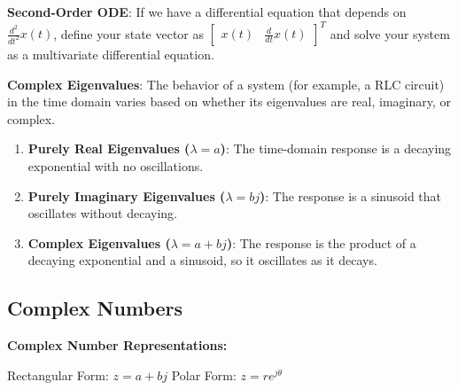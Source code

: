 \textbf{Second-Order ODE}: If we have a differential equation that depends on $\frac{d^2}{dt^2} x(t)$, define your state vector as $\begin{bmatrix} x(t) & \frac{d}{dt} x(t) \end{bmatrix}^T$ and solve your system as a multivariate differential equation.

\textbf{Complex Eigenvalues}: The behavior of a system (for example, a RLC circuit) in the time domain varies based on whether its eigenvalues are real, imaginary, or complex.
\begin{enumerate}
    \item \textbf{Purely Real Eigenvalues ($\lambda = a$)}: The time-domain response is a decaying exponential with no oscillations.
    \item \textbf{Purely Imaginary Eigenvalues ($\lambda = bj$)}: The response is a sinusoid that oscillates without decaying.
    \item \textbf{Complex Eigenvalues ($\lambda = a + bj$)}: The response is the product of a decaying exponential and a sinusoid, so it oscillates as it decays.
\end{enumerate}

\subsection*{Complex Numbers}
\textbf{Complex Number Representations:} 

\hspace{2 em} Rectangular Form: $z = a + bj$ \hspace{14em} Polar Form: $z = re^{j\theta}$

